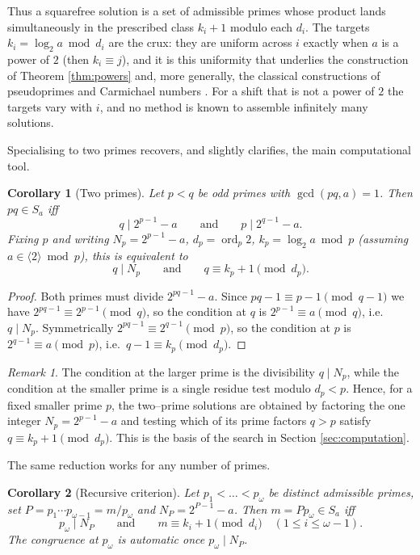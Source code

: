 \documentclass[11pt,reqno]{amsart}
\theoremstyle{plain}
\newtheorem{corollary}{Corollary}
\theoremstyle{definition}
\theoremstyle{remark}
\newtheorem{remark}{Remark}
\newcommand{\ord}{\operatorname{ord}}
\newcommand{\dvd}{\mid}
\newcommand{\Sa}{S_a}
\begin{document}
Thus a squarefree solution is a set of admissible primes whose product lands simultaneously in the prescribed class $k_i+1$ modulo each $d_i$. The targets $k_i=\log_2a\bmod d_i$ are the crux: they are uniform across $i$ exactly when $a$ is a power of $2$ (then $k_i\equiv j$), and it is this uniformity that underlies the construction of Theorem \ref{thm:powers} and, more generally, the classical constructions of pseudoprimes and Carmichael numbers \cite{cipolla,agp}. For a shift that is not a power of $2$ the targets vary with $i$, and no method is known to assemble infinitely many solutions.

Specialising to two primes recovers, and slightly clarifies, the main computational tool.

\begin{corollary}[Two primes]\label{cor:twoprime}
Let $p<q$ be odd primes with $\gcd(pq,a)=1$. Then $pq\in\Sa$ iff
\[
q\dvd 2^{p-1}-a\qquad\text{and}\qquad p\dvd 2^{q-1}-a.
\]
Fixing $p$ and writing $N_p=2^{p-1}-a$, $d_p=\ord_p2$, $k_p=\log_2a\bmod p$ (assuming $a\in\langle2\rangle\bmod p$), this is equivalent to
\[
q\dvd N_p\qquad\text{and}\qquad q\equiv k_p+1\pmod{d_p}.
\]
\end{corollary}

\begin{proof}
Both primes must divide $2^{pq-1}-a$. Since $pq-1\equiv p-1\pmod{q-1}$ we have $2^{pq-1}\equiv2^{p-1}\pmod q$, so the condition at $q$ is $2^{p-1}\equiv a\pmod q$, i.e.\ $q\dvd N_p$. Symmetrically $2^{pq-1}\equiv2^{q-1}\pmod p$, so the condition at $p$ is $2^{q-1}\equiv a\pmod p$, i.e.\ $q-1\equiv k_p\pmod{d_p}$.
\end{proof}

\begin{remark}\label{rem:onesided}
The condition at the larger prime is the divisibility $q\dvd N_p$, while the condition at the smaller prime is a single residue test modulo $d_p<p$. Hence, for a fixed smaller prime $p$, the two--prime solutions are obtained by factoring the one integer $N_p=2^{p-1}-a$ and testing which of its prime factors $q>p$ satisfy $q\equiv k_p+1\pmod{d_p}$. This is the basis of the search in Section \ref{sec:computation}.
\end{remark}

The same reduction works for any number of primes.

\begin{corollary}[Recursive criterion]\label{cor:recursive}
Let $p_1<\dots<p_\omega$ be distinct admissible primes, set $P=p_1\cdots p_{\omega-1}=m/p_\omega$ and $N_P=2^{P-1}-a$. Then $m=Pp_\omega\in\Sa$ iff
\[
p_\omega\dvd N_P\qquad\text{and}\qquad m\equiv k_i+1\pmod{d_i}\quad(1\le i\le\omega-1).
\]
The congruence at $p_\omega$ is automatic once $p_\omega\dvd N_P$.
\end{corollary}
\end{document}
